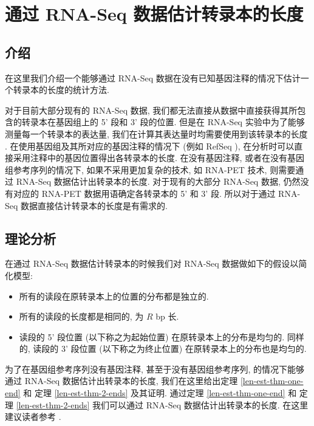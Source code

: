 \chapter{通过 RNA-Seq 数据估计转录本的长度}
\label{chap-lenest}

\section{介绍}
在这里我们介绍一个能够通过 RNA-Seq 数据在没有已知基因注释的情况下估计一个转录本的长度的统计方法. 

对于目前大部分现有的 RNA-Seq 数据, 
我们都无法直接从数据中直接获得其所包含的转录本在基因组上的 5' 段和 3' 段的位置. 
但是在 RNA-Seq 实验中为了能够测量每一个转录本的表达量, 
我们在计算其表达量时均需要使用到该转录本的长度 
\cite{mortazavi2008mapping, Jiang15042009, cufflinks.2010}. 
在使用基因组及其所对应的基因注释的情况下 (例如 RefSeq \cite{_refseq}), 
在分析时可以直接采用注释中的基因位置得出各转录本的长度. 
在没有基因注释, 或者在没有基因组参考序列的情况下, 
如果不采用更加复杂的技术, 如 RNA-PET \cite{Fullwood01042009} 技术, 
则需要通过 RNA-Seq 数据估计出转录本的长度. 对于现有的大部分 RNA-Seq 数据, 
仍然没有对应的 RNA-PET 数据用语确定各转录本的 5' 和 3' 段. 
所以对于通过 RNA-Seq 数据直接估计转录本的长度是有需求的. 

\section{理论分析}
在通过 RNA-Seq 数据估计转录本的时候我们对 RNA-Seq 数据做如下的假设以简化模型: 
\begin{itemize}
\item 所有的读段在原转录本上的位置的分布都是独立的. 

\item 所有的读段的长度都是相同的, 为 $R$ bp 长.

\item 读段的 5' 段位置 (以下称之为起始位置) 在原转录本上的分布是均匀的. 
同样的, 读段的 3' 段位置 (以下称之为终止位置) 在原转录本上的分布也是均匀的. 
\end{itemize}

为了在基因组参考序列没有基因注释, 甚至于没有基因组参考序列, 
的情况下能够通过 RNA-Seq 数据估计出转录本的长度, 
我们在这里给出定理 \ref{len-est-thm-one-end} 和 
定理 \ref{len-est-thm-2-ends} 及其证明. 
通过定理 \ref{len-est-thm-one-end} 和 
定理 \ref{len-est-thm-2-ends} 
我们可以通过 RNA-Seq 数据估计出转录本的长度. 
在这里建议读者参考 . 

